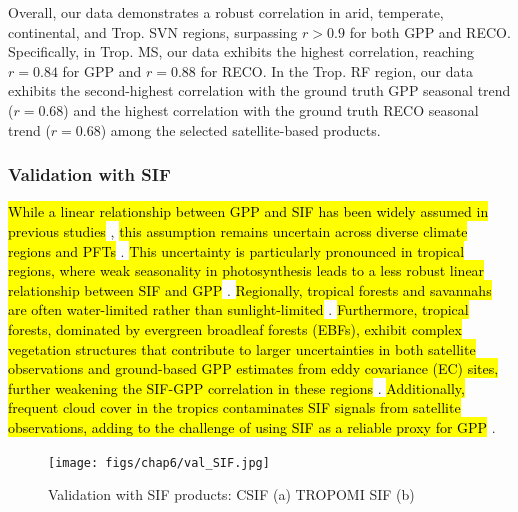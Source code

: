 Overall, our data demonstrates a robust correlation in arid, temperate, continental, and Trop. SVN regions, surpassing $r> 0.9$ for both GPP and RECO. Specifically, in Trop. MS, our data exhibits the highest correlation, reaching $r=0.84$ for GPP and $r=0.88$ for RECO. In the Trop. RF region, our data exhibits the second-highest correlation with the ground truth GPP seasonal trend ($r=0.68$) and the highest correlation with the ground truth RECO seasonal trend ($r=0.68$) among the selected satellite-based products. \par


\subsubsection{Validation with SIF}
\hl{While a linear relationship between GPP and SIF has been widely assumed in previous studies} \citep{guanter2012retrieval, yang2017chlorophyll}, \hl{this assumption remains uncertain across diverse climate regions and PFTs} \citep{gu2019sun, xiao2019solar, zhang2016model, chen2021seasonal}. \hl{This uncertainty is particularly pronounced in tropical regions, where weak seasonality in photosynthesis leads to a less robust linear relationship between SIF and GPP} \citep{doughty2021global}. \hl{Regionally, tropical forests and savannahs are often water-limited rather than sunlight-limited} \citep{guan2015photosynthetic, rs9060530, Madani_2020, palmer2023drivers}. \hl{Furthermore, tropical forests, dominated by evergreen broadleaf forests (EBFs), exhibit complex vegetation structures that contribute to larger uncertainties in both satellite observations and ground-based GPP estimates from eddy covariance (EC) sites, further weakening the SIF-GPP correlation in these regions} \citep{hayek201890, xietal2018, zhang2020111722, shekhar2022113282}. \hl{Additionally, frequent cloud cover in the tropics contaminates SIF signals from satellite observations, adding to the challenge of using SIF as a reliable proxy for GPP} \citep{doughty2021global, shekhar2022113282}.\par

\begin{figure}[tbh!]
    \centering
    \texttt{[image: figs/chap6/val\_SIF.jpg]}
    \caption[Validation with SIF products]{Validation with SIF products: CSIF (a) TROPOMI SIF (b)}
    \label{fig:chap6_fig5}
\end{figure}

